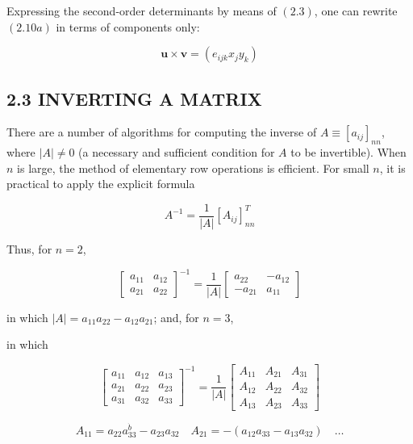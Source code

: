 \documentclass[10pt]{article}
\begin{document}
Expressing the second-order determinants by means of $(2.3)$, one can rewrite $(2.10 a)$ in terms of components only:


\begin{equation*}
\mathbf{u} \times \mathbf{v}=\left(e_{i j k} x_{j} y_{k}\right) \tag{2.10b}
\end{equation*}


\subsection*{2.3 INVERTING A MATRIX}
There are a number of algorithms for computing the inverse of $A \equiv\left[a_{i j}\right]_{n n}$, where $|A| \neq 0$ (a necessary and sufficient condition for $A$ to be invertible). When $n$ is large, the method of elementary row operations is efficient. For small $n$, it is practical to apply the explicit formula


\begin{equation*}
A^{-1}=\frac{1}{|A|}\left[A_{i j}\right]_{n n}^{T} \tag{2.11a}
\end{equation*}


Thus, for $n=2$,

\[
\left[\begin{array}{ll}
a_{11} & a_{12}  \tag{2.11b}\\
a_{21} & a_{22}
\end{array}\right]^{-1}=\frac{1}{|A|}\left[\begin{array}{rr}
a_{22} & -a_{12} \\
-a_{21} & a_{11}
\end{array}\right]
\]

in which $|A|=a_{11} a_{22}-a_{12} a_{21}$; and, for $n=3$,

in which

\[
\left[\begin{array}{lll}
a_{11} & a_{12} & a_{13}  \tag{2.11c}\\
a_{21} & a_{22} & a_{23} \\
a_{31} & a_{32} & a_{33}
\end{array}\right]^{-1}=\frac{1}{|A|}\left[\begin{array}{lll}
A_{11} & A_{21} & A_{31} \\
A_{12} & A_{22} & A_{32} \\
A_{13} & A_{23} & A_{33}
\end{array}\right]
\]

$$
A_{11}=a_{22} a_{33}^{\dot{b}}-a_{23} a_{32} \quad A_{21}=-\left(a_{12} a_{33}-a_{13} a_{32}\right) \quad \ldots
$$
\end{document}
